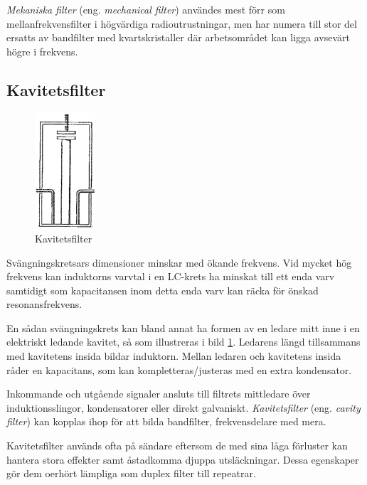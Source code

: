 \emph{Mekaniska filter} (eng. \emph{mechanical filter}) användes mest förr som
mellanfrekvensfilter i högvärdiga radioutrustningar, men har numera till stor
del ersatts av bandfilter med kvartskristaller där arbetsområdet kan ligga
avsevärt högre i frekvens.

\subsection{Kavitetsfilter}

\begin{figure}
  \includegraphics[width=0.2\textwidth]{images/cropped_pdfs/bild_2_3-31.pdf}
  \caption{Kavitetsfilter}
  \label{fig:BildII3-31}
\end{figure}

Svängningskretsars dimensioner minskar med ökande frekvens.
Vid mycket hög frekvens kan induktorns varvtal i en LC-krets ha minskat till
ett enda varv samtidigt som kapacitansen inom detta enda varv kan räcka för
önskad resonansfrekvens.

En sådan svängningskrets kan bland annat ha formen av en ledare mitt inne i en
elektriskt ledande kavitet, så som illustreras i bild \ref{fig:BildII3-31}.
Ledarens längd tillsammans med kavitetens insida bildar induktorn.
Mellan ledaren och kavitetens insida råder en kapacitans, som kan
kompletteras/justeras med en extra kondensator.

Inkommande och utgående signaler ansluts till filtrets mittledare över
induktionsslingor, kondensatorer eller direkt galvaniskt.
\emph{Kavitetsfilter} (eng. \emph{cavity filter}) kan kopplas ihop för att
bilda bandfilter, frekvensdelare med mera.

Kavitetsfilter används ofta på sändare eftersom de med sina låga förluster kan
hantera stora effekter samt åstadkomma djuppa utsläckningar.
Dessa egenskaper gör dem oerhört lämpliga som duplex filter till repeatrar.

